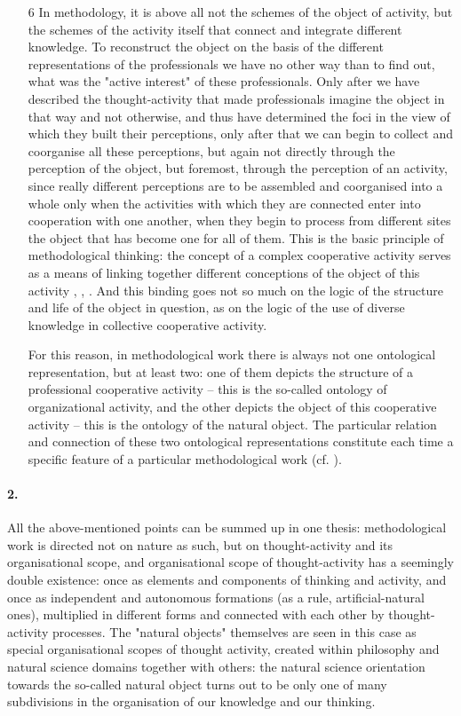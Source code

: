 \documentclass[11pt,a4paper]{article}
\begin{document}
\begin{itemize}
\item[6] In methodology, it is above all not the schemes of the object of
  activity, but the schemes of the activity itself that connect and integrate
  different knowledge. To reconstruct the object on the basis of the different
  representations of the professionals we have no other way than to find out,
  what was the "active interest" of these professionals. Only after we have
  described the thought-activity that made professionals imagine the object in
  that way and not otherwise, and thus have determined the foci in the view of
  which they built their perceptions, only after that we can begin to collect
  and coorganise all these perceptions, but again not directly through the
  perception of the object, but foremost, through the perception of an
  activity, since really different perceptions are to be assembled and
  coorganised into a whole only when the activities with which they are
  connected enter into cooperation with one another, when they begin to
  process from different sites the object that has become one for all of
  them. This is the basic principle of methodological thinking: the concept of
  a complex cooperative activity serves as a means of linking together
  different conceptions of the object of this activity
  \cite{Shchedrovitsky1965a, Shchedrovitsky1967g},
  \cite[pp. 50-84]{Shchedrovitsky1969b}, \cite{Development1975}. And this
  binding goes not so much on the logic of the structure and life of the
  object in question, as on the logic of the use of diverse knowledge in
  collective cooperative activity.
  
  For this reason, in methodological work there is always not one ontological
  representation, but at least two: one of them depicts the structure of a
  professional cooperative activity – this is the so-called ontology of
  organizational activity, and the other depicts the object of this
  cooperative activity – this is the ontology of the natural object. The
  particular relation and connection of these two ontological representations
  constitute each time a specific feature of a particular methodological work
  (cf. \cite{Shchedrovitsky1979b}).
\end{itemize}

\paragraph{2.}
All the above-mentioned points can be summed up in one thesis: methodological
work is directed not on nature as such, but on thought-activity and its
organisational scope, and organisational scope of thought-activity has a
seemingly double existence: once as elements and components of thinking and
activity, and once as independent and autonomous formations (as a rule,
artificial-natural ones), multiplied in different forms and connected with
each other by thought-activity processes. The "natural objects" themselves are
seen in this case as special organisational scopes of thought activity,
created within philosophy and natural science domains together with others:
the natural science orientation towards the so-called natural object turns out
to be only one of many subdivisions in the organisation of our knowledge and
our thinking.
\end{document}
